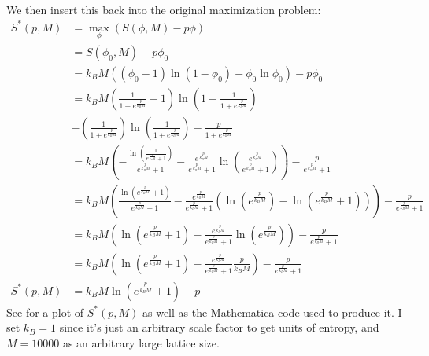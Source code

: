 \documentclass[a4paper,twoside]{article}
\begin{document}
\begin{itemize}
\begin{problem}
\begin{align}
            \end{align}
            We then insert this back into the original maximization problem:
            \begin{align}
                S^*(p, M) &= \max_{\phi}(S(\phi,M) - p\phi) \\
                &= S(\phi_0, M) - p\phi_0 \\
                &= k_B M \left( (\phi_0 - 1)\ln(1-\phi_0) - \phi_0 \ln\phi_0 \right) - p \phi_0 \\
                &= k_B M \left( \frac{1}{1 + e^{\frac{p}{k_B M}}} - 1 \right) \ln\left( 1 - \frac{1}{1 + e^{\frac{p}{k_B M}}} \right) \\
                &- \left( \frac{1}{1 + e^{\frac{p}{k_B M}}}\right) \ln\left( \frac{1}{1 + e^{\frac{p}{k_B M}}} \right) - \frac{p}{1 + e^{\frac{p}{k_B M}}} \\
                &= k_B M \left(-\frac{\ln \left(\frac{1}{e^{\frac{p}{k_B M}}+1}\right)}{e^{\frac{p}{k_B M}}+1}-\frac{e^{\frac{p}{k_B M}}}{e^{\frac{p}{k_B M}}+1} \ln \left(\frac{e^{\frac{p}{k_B M}}}{e^{\frac{p}{k_B M}}+1}\right)\right)-\frac{p}{e^{\frac{p}{k_B M}}+1} \\
                &= k_B M \left(\frac{\ln \left(e^{\frac{p}{k_B M}}+1\right)}{e^{\frac{p}{k_B M}}+1}-\frac{e^{\frac{p}{k_B M}}}{e^{\frac{p}{k_B M}}+1} \left(\ln \left(e^{\frac{p}{k_B M}}\right)-\ln \left(e^{\frac{p}{k_B M}}+1\right)\right)\right)-\frac{p}{e^{\frac{p}{k_B M}}+1}\\
                &= k_B M \left(\ln \left(e^{\frac{p}{k_B M}}+1\right)-\frac{e^{\frac{p}{k_B M}}}{e^{\frac{p}{k_B M}}+1}\ln \left(e^{\frac{p}{k_B M}}\right)\right)-\frac{p}{e^{\frac{p}{k_B M}}+1} \\
                &= k_B M \left(\ln \left(e^{\frac{p}{k_B M}}+1\right)- \frac{e^{\frac{p}{k_B M}}}{e^{\frac{p}{k_B M}}+1}\frac{p}{k_B M}\right)-\frac{p}{e^{\frac{p}{k_B M}}+1} \\
                S^*(p, M) &= k_B M \ln \left(e^{\frac{p}{k_B M}}+1\right)-p
            \end{align}
            See  for a plot of $ S^*(p, M) $ as well as the Mathematica code used to produce it. I set $ k_B = 1 $ since it's just an arbitrary scale factor to get units of entropy, and $ M = 10000 $ as an arbitrary large lattice size.
        \end{problem}
        \begin{figure}[h]
            \centering

\end{figure}
\end{itemize}
\end{document}
